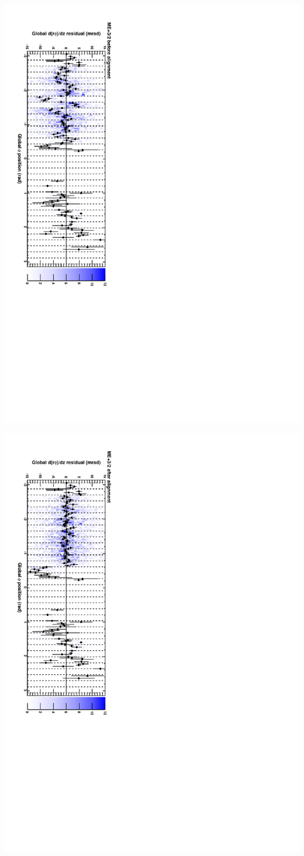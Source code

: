 \documentclass[compress]{beamer}
\begin{document}
\begin{frame}
\includegraphics[height=\linewidth, angle=90]{cscphiy_mep32_before.pdf}

\includegraphics[height=\linewidth, angle=90]{cscphiy_mep32_after.pdf}
\end{frame}
\end{document}
